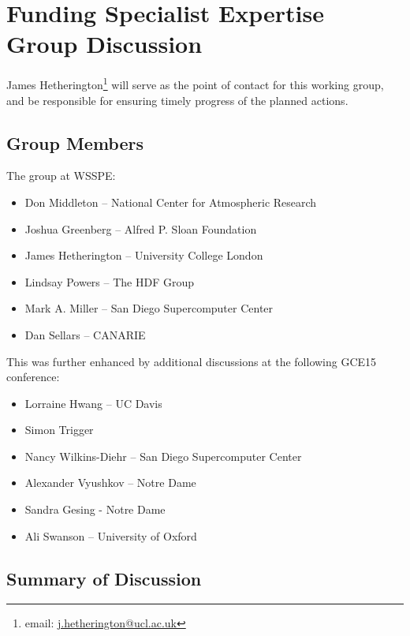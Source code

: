 \section{Funding Specialist Expertise Group Discussion}
\label{sec:appendix_funding_spec_expert}

James Hetherington\footnote{email: \href{mailto:j.hetherington@ucl.ac.uk}{j.hetherington@ucl.ac.uk}}
will serve as the point of contact for this working group, and be responsible for ensuring timely progress of the planned actions.

\subsection{Group Members}

The group at WSSPE:

\begin{itemize}
\item Don Middleton -- National Center for Atmospheric Research
\item Joshua Greenberg -- Alfred P. Sloan Foundation
\item James Hetherington -- University College London
\item Lindsay Powers -- The HDF Group
\item Mark A. Miller -- San Diego Supercomputer Center
\item Dan Sellars -- CANARIE
\end{itemize}

This was further enhanced by additional discussions at the following
GCE15 conference:

\begin{itemize}
\item Lorraine Hwang -- UC Davis
\item Simon Trigger
\item Nancy Wilkins-Diehr -- San Diego Supercomputer Center
\item Alexander Vyushkov -- Notre Dame
\item Sandra Gesing - Notre Dame
\item Ali Swanson -- University of Oxford

\end{itemize}

\subsection{Summary of Discussion}

